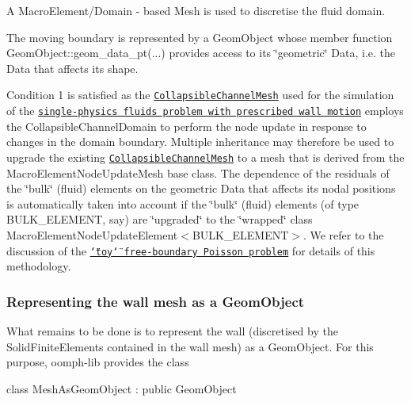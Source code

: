 \begin{DoxyEnumerate}
\item A {\ttfamily Macro\+Element/\+Domain} -\/ based Mesh is used to discretise the fluid domain.
\item The moving boundary is represented by a {\ttfamily Geom\+Object} whose member function {\ttfamily Geom\+Object\+::geom\+\_\+data\+\_\+pt}(...) provides access to its \char`\"{}geometric\char`\"{} {\ttfamily Data}, i.\+e. the {\ttfamily Data} that affects its shape.
\end{DoxyEnumerate}Condition 1 is satisfied as the \href{../../../meshes/mesh_list/html/index.html#collapsible_channel}{\tt {\ttfamily Collapsible\+Channel\+Mesh}} used for the simulation of the \href{../../../navier_stokes/collapsible_channel/html/index.html}{\tt single-\/physics fluids problem with prescribed wall motion} employs the {\ttfamily Collapsible\+Channel\+Domain} to perform the node update in response to changes in the domain boundary. Multiple inheritance may therefore be used to upgrade the existing \href{../../../meshes/mesh_list/html/index.html#collapsible_channel}{\tt {\ttfamily Collapsible\+Channel\+Mesh}} to a mesh that is derived from the {\ttfamily Macro\+Element\+Node\+Update\+Mesh} base class. The dependence of the residuals of the \char`\"{}bulk\char`\"{} (fluid) elements on the geometric {\ttfamily Data} that affects its nodal positions is automatically taken into account if the \char`\"{}bulk\char`\"{} (fluid) elements (of type {\ttfamily B\+U\+L\+K\+\_\+\+E\+L\+E\+M\+E\+NT}, say) are \char`\"{}upgraded\char`\"{} to the \char`\"{}wrapped\char`\"{} class {\ttfamily Macro\+Element\+Node\+Update\+Element$<$\+B\+U\+L\+K\+\_\+\+E\+L\+E\+M\+E\+N\+T$>$}. We refer to the discussion of the \href{../../macro_element_free_boundary_poisson/html/index.html}{\tt \char`\"{}toy\char`\"{} free-\/boundary Poisson problem} for details of this methodology.\hypertarget{index_wall_geom_object}{}\subsubsection{Representing the wall mesh as a Geom\+Object}\label{index_wall_geom_object}
What remains to be done is to represent the wall (discretised by the {\ttfamily Solid\+Finite\+Elements} contained in the wall mesh) as a {\ttfamily Geom\+Object}. For this purpose, {\ttfamily oomph-\/lib} provides the class


\begin{DoxyCode}
\textcolor{keyword}{class }MeshAsGeomObject : \textcolor{keyword}{public} GeomObject
\end{DoxyCode}


